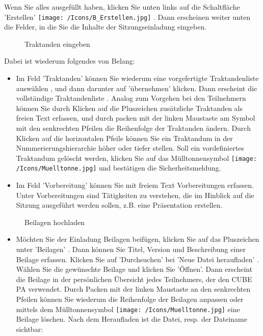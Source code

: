 Wenn Sie alles ausgefüllt haben, klicken Sie unten links auf die Schaltfläche 'Erstellen' \texttt{[image: /Icons/B\_Erstellen.jpg]} . Dann erscheinen weiter unten die Felder, in die Sie die Inhalte der Sitzungseinladung eingeben.

\begin{figure}[H]
\caption{Traktanden eingeben}
\end{figure}

Dabei ist wiederum folgendes von Belang:

\begin{itemize}
\item 
Im Feld 'Traktanden' können Sie wiederum eine vorgefertigte Traktandenliste auswählen , und dann darunter auf 'übernehmen'  klicken. Dann erscheint die vollständige Traktandenliste . Analog zum Vorgehen bei den Teilnehmern können Sie durch Klicken auf die Pluszeichen  zusätzliche Traktanden als freien Text erfassen, und durch packen mit der linken Maustaste am Symbol mit den senkrechten Pfeilen  die Reihenfolge der Traktanden ändern. Durch Klicken auf die horizontalen Pfeile  können Sie ein Traktandum in der Nummerierungshierarchie höher oder tiefer stellen. Soll ein vordefiniertes Traktandum gelöscht werden, klicken Sie auf das Mülltonnensymbol \texttt{[image: /Icons/Muelltonne.jpg]}  und bestätigen die Sicherheitsmeldung.
\item 
Im Feld 'Vorbereitung' können Sie mit freiem Text Vorbereitungen  erfassen. Unter Vorbereitungen sind Tätigkeiten zu verstehen, die im Hinblick auf die Sitzung ausgeführt werden sollen, z.B. eine Präsentation erstellen.
\end{itemize}

\begin{figure}[H]
\caption{Beilagen hochladen}
\end{figure}

\begin{itemize}
\item 
Möchten Sie der Einladung Beilagen beifügen, klicken Sie auf das Pluszeichen unter 'Beilagen' . Dann können Sie Titel, Version und Beschreibung einer Beilage erfassen. Klicken Sie auf 'Durchsuchen' bei 'Neue Datei heraufladen' . Wählen Sie die gewünschte Beilage und klicken Sie 'Öffnen'. Dann erscheint die Beilage in der persönlichen Übersicht jedes Teilnehmers, der den CUBE PA verwendet. Durch Packen mit der linken Maustaste an den senkrechten Pfeilen können Sie wiederum die Reihenfolge der Beilagen anpassen oder mittels dem Mülltonnensymbol \texttt{[image: /Icons/Muelltonne.jpg]} eine Beilage löschen. Nach dem Heraufladen ist die Datei, resp. der Dateiname sichtbar:
\end{itemize}

